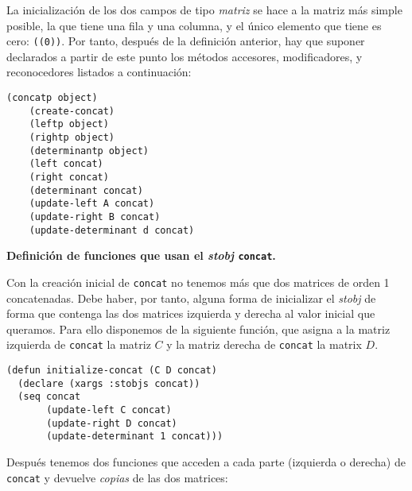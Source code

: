 \documentclass[a4paper,10pt]{article}
\begin{document}
La inicialización de los dos campos de tipo \emph{matriz} se hace a la matriz más simple posible, la que tiene una fila y una columna, y el único elemento que tiene es cero: \texttt{((0))}. Por tanto, después de la definición anterior, hay que suponer declarados a partir de este punto los métodos accesores, modificadores, y reconocedores listados a continuación:

\par \vspace{10pt}

\begin{lstlisting}[language=clips]
	(concatp object)
	(create-concat)
	(leftp object)
	(rightp object)
	(determinantp object)
	(left concat)
	(right concat)
	(determinant concat)
	(update-left A concat)
	(update-right B concat)
	(update-determinant d concat)
\end{lstlisting}

\par \vspace{14pt}

\textbf{Definición de funciones que usan el \emph{stobj} \texttt{concat}.}

\par \vspace{10pt}

Con la creación inicial de \texttt{concat} no tenemos más que dos matrices de orden 1 concatenadas. Debe haber, por tanto, alguna forma de inicializar el \emph{stobj} de forma que contenga las dos matrices izquierda y derecha al valor inicial que queramos. Para ello disponemos de la siguiente función, que asigna a la matriz izquierda de \texttt{concat} la matriz $C$ y la matriz derecha de \texttt{concat} la matrix $D$.

\par \vspace{10pt}

\begin{lstlisting}[language=clips]
(defun initialize-concat (C D concat)
  (declare (xargs :stobjs concat))
  (seq concat
       (update-left C concat)
       (update-right D concat)
       (update-determinant 1 concat)))
\end{lstlisting}

\par \vspace{10pt}

Después tenemos dos funciones que acceden a cada parte (izquierda o derecha) de \texttt{concat} y devuelve \emph{copias} de las dos matrices:
 
\end{document}
